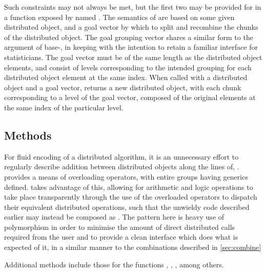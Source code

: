 Such constraints may not always be met, but the first two may be provided for in a function exposed by \lsr named .
The semantics of  are based on some given distributed object, and a goal vector by which to split and recombine the chunks of the distributed object.
The goal grouping vector shares a similar form to the  argument of base-\R {}, in keeping with the intention to retain a familiar \R interface for statisticians.
The goal vector must be of the same length as the distributed object elements, and consist of levels corresponding to the intended grouping for each distributed object element at the same index.
When called with a distributed object and a goal vector,  returns a new distributed object, with each chunk corresponding to a level of the goal vector, composed of the original elements at the same index of the particular level.

\subsection{Methods}

For fluid encoding of a distributed algorithm, it is an unnecessary effort to regularly describe addition between distributed objects along the lines of, .
\R provides a means of overloading operators, with entire groups having generics defined.
\lsr takes advantage of this, allowing for arithmetic and logic operations to take place transparently through the use of the overloaded operators to dispatch their equivalent distributed operations, such that the unwieldy code described earlier may instead be composed as .
The pattern here is heavy use of polymorphism in order to minimise the amount of direct distributed calls required from the user and to provide a clean interface which does what is expected of it, in a similar manner to the combinations described in \cref{sec:combine}

Additional methods include those for the functions , , , among others.

